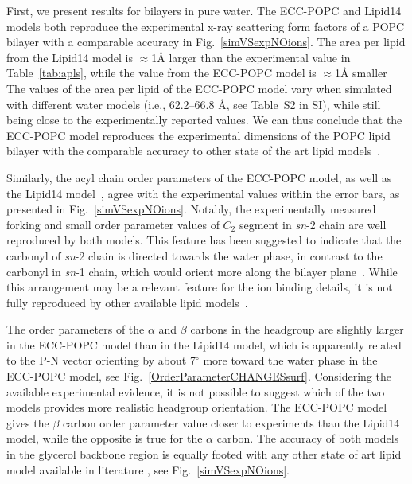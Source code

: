 \documentclass[aip,jcp,twocolumn]{revtex4}
\begin{document}
First, we present results for bilayers in pure water.
The ECC-POPC and Lipid14 models both reproduce the experimental x-ray scattering form factors
of a POPC bilayer with a comparable accuracy in Fig.~\ref{simVSexpNOions}.
The area per lipid from the Lipid14 model is $\approx$1\AA{} larger than the
experimental value in Table~\ref{tab:apls}, while the value from the ECC-POPC model
is $\approx$1\AA{} smaller
The values of the area per lipid of the ECC-POPC model vary
when simulated with different water models (i.e., 62.2--66.8 \AA{}, see Table~S2 in SI),
while still being close to the experimentally reported values.
We can thus conclude that the ECC-POPC model reproduces the experimental dimensions of the POPC
lipid bilayer with the comparable accuracy to other state of the art lipid models~\cite{ollila16}.


Similarly, the acyl chain order parameters of the ECC-POPC model, as well as the Lipid14 model~\cite{dickson14}, agree with the experimental values within the error bars, as presented in Fig.~\ref{simVSexpNOions}. Notably, the experimentally measured forking and small order parameter values of $C_2$ segment in {\it sn}-2 chain are well reproduced by both models. This feature has been suggested to indicate that the carbonyl of {\it sn}-2 chain is directed towards the water phase, in contrast to the carbonyl in {\it sn}-1 chain, which would orient more along the bilayer plane~\cite{seelig75,schindler75,gawrisch92}.
While this arrangement may be a relevant feature for the ion binding details, it is not fully reproduced by other available lipid models~\cite{ollila16}.

The order parameters of the $\alpha$ and $\beta$ carbons in the headgroup are slightly larger in the ECC-POPC model than in the Lipid14 model, which is apparently related to the P-N vector orienting by about 7$^{\circ}$ more toward the water phase in the ECC-POPC model, see Fig.~\ref{OrderParameterCHANGESsurf}. Considering the available experimental evidence, it is not possible to suggest which of the two models provides more realistic headgroup orientation. The ECC-POPC model gives the $\beta$ carbon order parameter value closer to experiments than the Lipid14 model, while the opposite is true for the $\alpha$ carbon. The accuracy of both models in the glycerol backbone region is equally footed with any other state of art lipid model available in literature \cite{botan15}, see Fig.~\ref{simVSexpNOions}.
\end{document}
